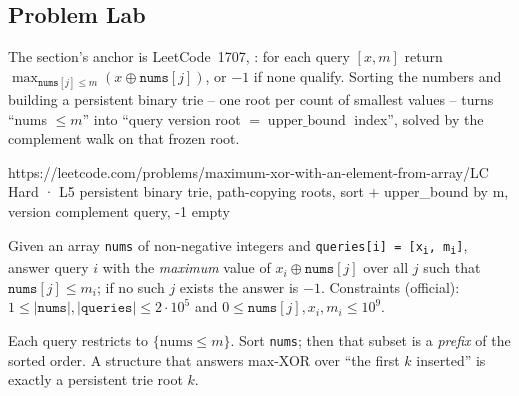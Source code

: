 \subsection{Problem Lab}

The section's anchor is LeetCode~1707, : for each query $[x,m]$ return
$\max_{\texttt{nums}[j]\le m}(x\oplus \texttt{nums}[j])$, or $-1$ if none qualify. Sorting the numbers and
building a persistent binary trie -- one root per count of smallest values -- turns ``nums $\le m$'' into
``query version root $= \operatorname{upper\_bound}$ index'', solved by the  complement
walk on that frozen root.

  {https://leetcode.com/problems/maximum-xor-with-an-element-from-array/}{LC Hard · L5}
  {persistent binary trie, path-copying roots, sort + upper\_bound by m, version complement query, -1 empty}

\begin{problemstatement}
Given an array \texttt{nums} of non-negative integers and \texttt{queries[i] = [x\textsubscript{i}, m\textsubscript{i}]},
answer query $i$ with the \emph{maximum} value of $x_i \oplus \texttt{nums}[j]$ over all $j$ such that
$\texttt{nums}[j] \le m_i$; if no such $j$ exists the answer is $-1$. Constraints (official):
$1 \le |\texttt{nums}|, |\texttt{queries}| \le 2\cdot 10^{5}$ and $0 \le \texttt{nums}[j], x_i, m_i \le 10^{9}$.
\end{problemstatement}

\begin{attemptgate}
Each query restricts to $\{\text{nums} \le m\}$. Sort \texttt{nums}; then that subset is a \emph{prefix} of
the sorted order. A structure that answers max-XOR over ``the first $k$ inserted'' is exactly a persistent
trie root $k$.
\end{attemptgate}

